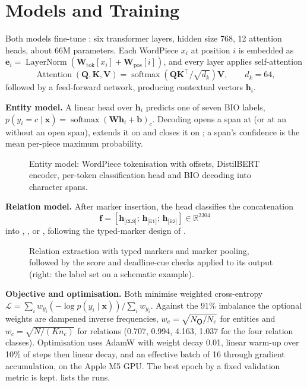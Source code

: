 \chapter{Models and Training}
\label{ch:models}

Both models fine-tune  \citep{sanh2019distilbert}: six transformer layers, hidden size 768, 12 attention heads, about 66M parameters. Each WordPiece $x_i$ at position $i$ is embedded as $\mathbf{e}_i=\operatorname{LayerNorm}(\mathbf{W}_{\text{tok}}[x_i]+\mathbf{W}_{\text{pos}}[i])$, and every layer applies self-attention
\begin{equation}
\operatorname{Attention}(\mathbf{Q},\mathbf{K},\mathbf{V})=\operatorname{softmax}\!\left(\mathbf{Q}\mathbf{K}^{\top}/\sqrt{d_k}\right)\mathbf{V},\qquad d_k=64,
\end{equation}
followed by a feed-forward network, producing contextual vectors $\mathbf{h}_i$.

\textbf{Entity model.} A linear head over $\mathbf{h}_i$ predicts one of seven BIO labels, $p(y_i=c\mid\mathbf{x})=\operatorname{softmax}(\mathbf{W}\mathbf{h}_i+\mathbf{b})_c$. Decoding opens a span at  (or at an  without an open span), extends it on  and closes it on ; a span's confidence is the mean per-piece maximum probability.


\begin{figure}[htbp]
\centering
{}
\caption{Entity model: WordPiece tokenisation with offsets, DistilBERT encoder, per-token classification head and BIO decoding into character spans.}
\label{fig:entitymodel}
\end{figure}

\textbf{Relation model.} After marker insertion, the head classifies the concatenation
\[\mathbf{f}=[\mathbf{h}_{\texttt{[CLS]}};\,\mathbf{h}_{\texttt{[E1]}};\,\mathbf{h}_{\texttt{[E2]}}]\in\mathbb{R}^{2304}\]
into , ,  or , following the typed-marker design of \citet{zhong2021pure}.


\begin{figure}[htbp]
\centering
{}
\caption{Relation extraction with typed markers and marker pooling, followed by the score and deadline-cue checks applied to its output (right: the label set on a schematic example).}
\label{fig:relmodel}
\end{figure}

\textbf{Objective and optimisation.} Both minimise weighted cross-entropy $\mathcal{L}=\sum_i w_{y_i}(-\log p(y_i\mid\mathbf{x}))/\sum_i w_{y_i}$. Against the 91\%  imbalance the optional weights are dampened inverse frequencies, $w_c=\sqrt{N_{\lab{O}}/N_c}$ for entities and $w_c=\sqrt{N/(K n_c)}$ for relations (0.707, 0.994, 4.163, 1.037 for the four relation classes). Optimisation uses AdamW \citep{loshchilov2019adamw} with weight decay 0.01, linear warm-up over 10\% of steps then linear decay, and an effective batch of 16 through gradient accumulation, on the Apple M5 GPU. The best epoch by a fixed validation metric is kept.  lists the runs.


